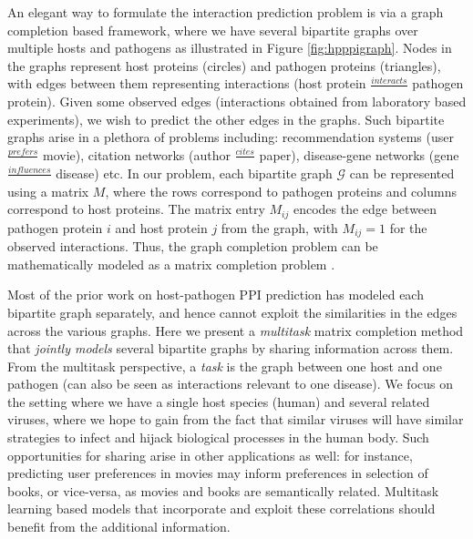 \documentclass[runningheads,a4paper]{llncs}
\begin{document}
An elegant way to formulate the interaction prediction problem is via a graph completion based framework, where we have several bipartite 
graphs over multiple hosts and pathogens as illustrated in Figure \ref{fig:hpppigraph}.
Nodes in the graphs represent host proteins (circles) and pathogen proteins (triangles), with edges between them representing interactions 
(host protein $\frac{interacts}{}$ pathogen protein).
Given some observed edges (interactions obtained from laboratory based experiments), we wish to predict the other edges in the graphs.
Such bipartite graphs arise in a plethora of problems including: recommendation systems (user $\frac{prefers}{}$ movie), 
citation networks (author $\frac{cites}{}$ paper), disease-gene networks (gene $\frac{influences}{}$ disease) etc. 
In our problem, each bipartite graph $\mathcal{G}$ can be represented using a matrix $M$, where the rows correspond to pathogen proteins 
and columns correspond to host proteins.
The matrix entry $M_{ij}$ encodes the edge between pathogen protein $i$ and host protein $j$ from the graph, with $M_{ij}=1$ for the observed interactions. 
Thus, the graph completion problem can be mathematically modeled as a matrix completion problem \citep{candes08}. 

Most of the prior work on host-pathogen PPI prediction has modeled each bipartite graph separately, and hence cannot exploit the similarities 
in the edges across the various graphs. Here we present a \textit{multitask} matrix completion method that \textit{jointly models} 
several bipartite graphs by sharing information across them. 
From the multitask perspective, a \textit{task} is the graph between one host and one pathogen (can also be seen as interactions relevant to one disease). 
We focus on the setting where we have a single host species (human) and several related viruses, where we hope to gain from the 
fact that similar viruses will have similar strategies to infect and hijack biological processes in the human body.
Such opportunities for sharing arise in other applications as well: for instance, predicting user preferences in movies may inform preferences in selection of books, 
or vice-versa, as movies and books are semantically related. Multitask learning based models that incorporate and exploit these correlations should benefit from 
the additional information.%
\end{document}
